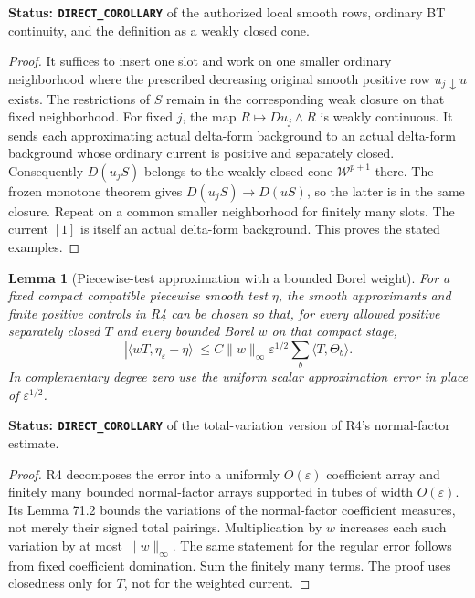 \documentclass[11pt,a4paper]{article}
\numberwithin{equation}{section}
\newtheorem{lemma}[theorem]{Lemma}
\theoremstyle{definition}
\theoremstyle{remark}
\begin{document}
\noindent\textbf{Status: \texttt{DIRECT\_COROLLARY}} of the
authorized local smooth rows, ordinary BT continuity, and
the definition as a weakly closed cone.

\begin{proof}
It suffices to insert one slot and work on one smaller
ordinary neighborhood where the prescribed decreasing
original smooth positive row $u_j\downarrow u$ exists.
The restrictions of $S$ remain in the corresponding weak
closure on that fixed neighborhood. For fixed $j$,
the map $R\mapsto Du_j\wedge R$ is weakly continuous.
It sends each approximating actual delta-form background
to an actual delta-form background whose ordinary current
is positive and separately closed. Consequently
$D(u_jS)$ belongs to the weakly closed cone
$\mathcal W^{p+1}$ there. The frozen monotone theorem gives
$D(u_jS)\to D(uS)$, so the latter is in the same closure.
Repeat on a common smaller neighborhood for finitely
many slots. The current $[1]$ is itself an actual
delta-form background. This proves the stated examples.
\end{proof}

\begin{lemma}[Piecewise-test approximation with a bounded Borel weight]
\label{lem:r6-weighted-pws-error}
For a fixed compact compatible piecewise smooth test
$\eta$, the smooth approximants and finite positive
controls in R4 can be chosen so that, for every allowed
positive separately closed $T$ and every bounded Borel
$w$ on that compact stage,
\[
 |\langle wT,\eta_\varepsilon-\eta\rangle|
   \leq C\|w\|_\infty\varepsilon^{1/2}
                         \sum_b\langle T,\Theta_b\rangle.
\]
In complementary degree zero use the uniform scalar
approximation error in place of $\varepsilon^{1/2}$.
\end{lemma}

\noindent\textbf{Status: \texttt{DIRECT\_COROLLARY}} of the
total-variation version of R4's normal-factor estimate.

\begin{proof}
R4 decomposes the error into a uniformly $O(\varepsilon)$
coefficient array and finitely many bounded normal-factor
arrays supported in tubes of width $O(\varepsilon)$.
Its Lemma 71.2 bounds the variations of the normal-factor
coefficient measures, not merely their signed total
pairings. Multiplication by $w$ increases each such
variation by at most $\|w\|_\infty$. The same statement
for the regular error follows from fixed coefficient
domination. Sum the finitely many terms. The proof uses
closedness only for $T$, not for the weighted current.
\end{proof}
\end{document}

